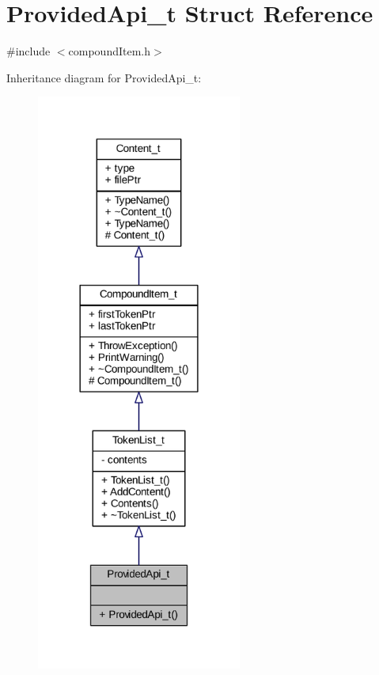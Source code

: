 \hypertarget{struct_provided_api__t}{}\section{Provided\+Api\+\_\+t Struct Reference}
\label{struct_provided_api__t}


{\ttfamily \#include $<$compound\+Item.\+h$>$}



Inheritance diagram for Provided\+Api\+\_\+t\+:
\nopagebreak
\begin{figure}[H]
\begin{center}
\leavevmode
\includegraphics[width=191pt]{struct_provided_api__t__inherit__graph}
\end{center}
\end{figure}


